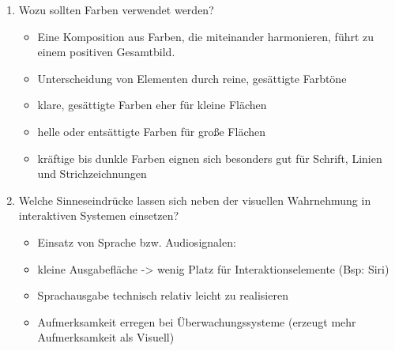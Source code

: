 \begin{enumerate}
	\item Wozu sollten Farben verwendet werden?
	\begin{itemize}
		\item Eine Komposition aus Farben, die miteinander harmonieren, führt zu einem positiven Gesamtbild.
		\item Unterscheidung von Elementen durch reine, gesättigte Farbtöne
		\item klare, gesättigte Farben eher für kleine Flächen
		\item helle oder entsättigte Farben für große Flächen
		\item kräftige bis dunkle Farben eignen sich besonders gut für Schrift, Linien und Strichzeichnungen
	\end{itemize}
	
	\item Welche Sinneseindrücke lassen sich neben der visuellen Wahrnehmung in
	interaktiven Systemen einsetzen?
	\begin{itemize}
		\item Einsatz von Sprache bzw. Audiosignalen:
		\item kleine Ausgabefläche -> wenig Platz für Interaktionselemente (Bsp: Siri)
		\item Sprachausgabe technisch relativ leicht zu realisieren
		\item Aufmerksamkeit erregen bei Überwachungssysteme (erzeugt mehr Aufmerksamkeit als Visuell)
	\end{itemize}
\end{enumerate}


